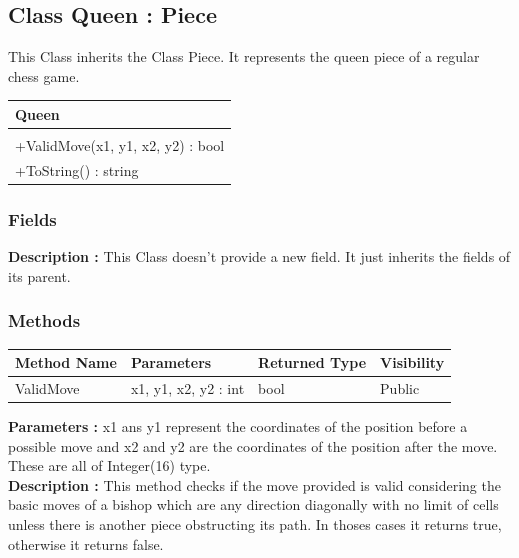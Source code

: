 \documentclass[12pt]{article}
\begin{document}

\subsection{Class Queen : Piece}

This Class inherits the Class Piece. It represents the queen 
piece of a regular chess game.
\begin{table}[H]
    \begin{tabular}{|l|}
    \hline
    \cellcolor[HTML]{C0C0C0}\textbf{Queen} \\ \hline
    \cellcolor[HTML]{EFEFEF}                    \\ \hline
    +ValidMove(x1, y1, x2, y2) : bool           \\ \hline
    +ToString() : string                        \\ \hline
    \end{tabular}
\end{table}

\subsubsection{Fields}

\textbf{Description :} This Class doesn't provide a new field. It just
inherits the fields of its parent.

\subsubsection{Methods}

\begin{table}[H]
    \begin{tabular}{|l|l|l|l|}
    \hline
    \rowcolor[HTML]{EFEFEF} 
    \cellcolor[HTML]{EFEFEF}\textbf{Method Name} & \textbf{Parameters}  & \textbf{Returned Type} & \textbf{Visibility} \\ \hline
    ValidMove                          & x1, y1, x2, y2 : int & bool                   & Public              \\ \hline
    \end{tabular}
\end{table}

\textbf{Parameters :} x1 ans y1 represent the coordinates of the position before a possible move
and x2 and y2 are the coordinates of the position after the move. These are all of Integer(16) type.
\\
\textbf{Description :} This method checks if the move provided is valid considering the basic moves of a bishop which
are any direction diagonally with no limit of cells unless there is another piece obstructing its path. In thoses 
cases it returns true, otherwise it returns false. 
\end{document}
